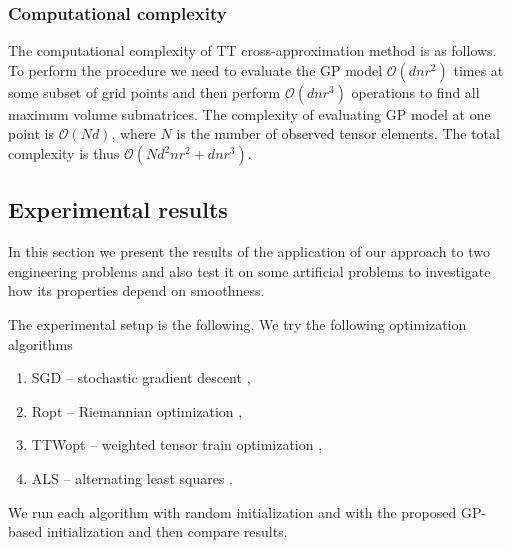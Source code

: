\subsubsection{Computational complexity}
The computational complexity of TT cross-approximation method is as follows.
To perform the procedure we need to evaluate the GP model $\mathcal{O}(dnr^2)$ times at some subset of grid points
and then perform $\mathcal{O}(dnr^3)$ operations to find all maximum volume submatrices.
The complexity of evaluating GP model at one point is $\mathcal{O}(Nd)$, where $N$ is the number of observed tensor elements.
The total complexity is thus $\mathcal{O}(Nd^2nr^2 + dnr^3)$.

\subsection{Experimental results}
\label{sec:tensor_completion_experiments}
In this section we present the results of the application of our approach
to two engineering problems and also test it on some artificial problems to investigate how its properties depend on smoothness.

The experimental setup is the following.
We try the following optimization algorithms
\begin{enumerate}
    \item SGD -- stochastic gradient descent \citep{zhao2018high},
    \item Ropt -- Riemannian optimization \citep{steinlechner2016riemannian},
    \item TTWopt -- weighted tensor train optimization \citep{zhao2018high},
    \item ALS  -- alternating least squares \citep{grasedyck2013alternating}.
\end{enumerate}
We run each algorithm with random initialization and with the
proposed GP-based initialization and then compare results.


